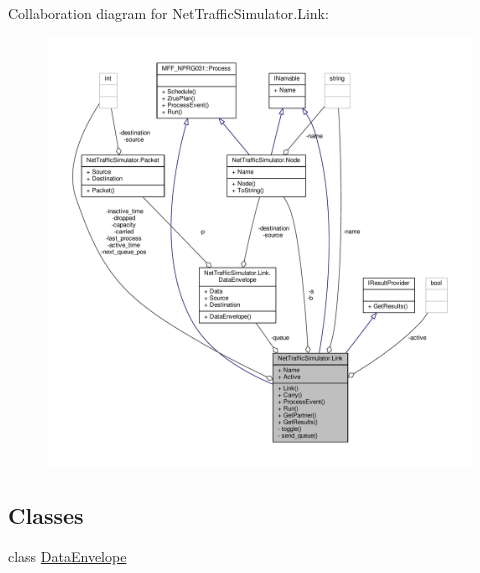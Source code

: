 Collaboration diagram for Net\-Traffic\-Simulator.\-Link\-:
\nopagebreak
\begin{figure}[H]
\begin{center}
\leavevmode
\includegraphics[width=350pt]{classNetTrafficSimulator_1_1Link__coll__graph}
\end{center}
\end{figure}
\subsection*{Classes}
\begin{DoxyCompactItemize}
\item 
class \hyperlink{classNetTrafficSimulator_1_1Link_1_1DataEnvelope}{Data\-Envelope}
\end{DoxyCompactItemize}
